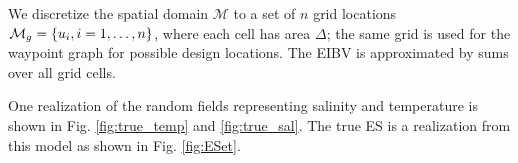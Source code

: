 \documentclass[aoas]{imsart}
\begin{document}
We discretize the spatial domain $\mathcal{M}$ to a set of $n$ grid
locations $\mathcal{M}_g = \{u_i, i=1,\ldots,n \}$,  where each cell
has area $\Delta$; the same grid is used for the waypoint graph for
possible design locations. The EIBV is approximated by sums over all
grid cells.

One realization of the random fields representing salinity and
temperature is shown in Fig. \ref{fig:true_temp} and
\ref{fig:true_sal}. The true ES is a realization from this model as
shown in Fig. \ref{fig:ESet}.

\begin{figure}[!h]
  \centering
  \hfill
  \hfill

\end{figure}
\end{document}
